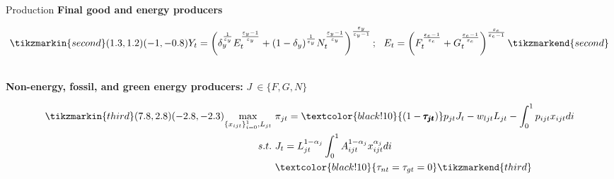 \documentclass[11pt,aspectratio=169]{beamer}
\begin{document}
\begin{frame}{ Production}
\textbf{Final good and energy producers }
\vspace{-5mm}
	\begin{minipage}[t!]{1\textwidth}
		\begin{align*}
		\tikzmarkin{second}(1.3,1.2)(-1,-0.8)
Y_t=\left(\delta_y^{\frac{1}{\varepsilon_y}}E_t^\frac{\varepsilon_y-1}{\varepsilon_y}+(1-\delta_y)^{\frac{1}{\varepsilon_y}}N_t^\frac{\varepsilon_y-1}{\varepsilon_y}\right)^\frac{\varepsilon_y}{\varepsilon_y-1}; \ \ 
E_t=\left({F}_t^\frac{\varepsilon_e-1}{\varepsilon_e}+G_t^\frac{\varepsilon_e-1}{\varepsilon_e}\right)^\frac{\varepsilon_e}{\varepsilon_e-1}
\tikzmarkend{second}
\end{align*}
	\end{minipage}
\pause
\\

\vspace{12mm}
\textbf{Non-energy, fossil, and green energy producers:} $J\ \in\{F,G,N\}$
	\vspace{-3mm}
\begin{minipage}[t!]{1\textwidth}
	\begin{align*}
	\tikzmarkin{third}(7.8,2.8)(-2.8,-2.3)
\underset{\{x_{ijt}\}_{i=0}^1, L_{jt}}{\max}\ & \pi_{jt}=\textcolor{black!10}{(1-{\pmb{\tau_{jt}}})}p_{jt}J_t-w_{ljt}L_{jt}-\int_{0}^{1}p_{ijt}x_{ijt}di\\ 
 s.t.\ & J_{t}=L_{jt}^{1-\alpha_j}\int_{0}^{1}A^{1-\alpha_j}_{ijt}x_{ijt}^{\alpha_j}di \\
 \ & \textcolor{black!10}{\tau_{nt}=\tau_{gt}=0}
	\tikzmarkend{third}
	\end{align*}
\end{minipage}
\end{frame}
\end{document}
